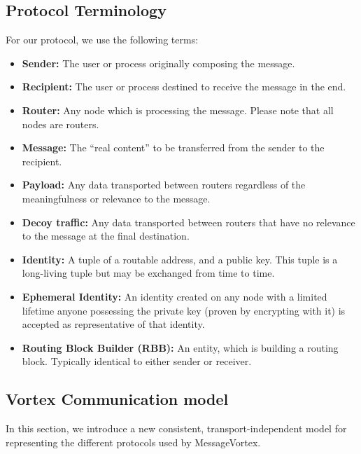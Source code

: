 
\subsection{Protocol Terminology}
For our protocol, we use the following terms:
\begin{itemize}
	\item \textbf{Sender:} The user or process originally composing the message.
	\item \textbf{Recipient:} The user or process destined to receive the message in the end.
	\item \textbf{Router:} Any node which is processing the message. Please note that all nodes are routers.
	\item \textbf{Message:} The ``real content'' to be transferred from the sender to the recipient.
	\item \textbf{Payload:} Any data transported between routers regardless of the meaningfulness or relevance to the message.
	\item \textbf{Decoy traffic:} Any data transported between routers that have no relevance to the message at the final destination.
	\item \textbf{Identity:} A tuple of a routable address, and a public key. This tuple is a long-living tuple but may be exchanged from time to time. 
	\item \textbf{Ephemeral Identity:} An identity created on any node with a limited lifetime anyone possessing the private key (proven by encrypting with it) is accepted as representative of that identity.
	\item \textbf{Routing Block Builder (RBB):} An entity, which is building a routing block. Typically identical to either sender or receiver.
\end{itemize}

\subsection{Vortex Communication model}
In this section, we introduce a new consistent, transport-independent model for representing the different protocols used by MessageVortex.

